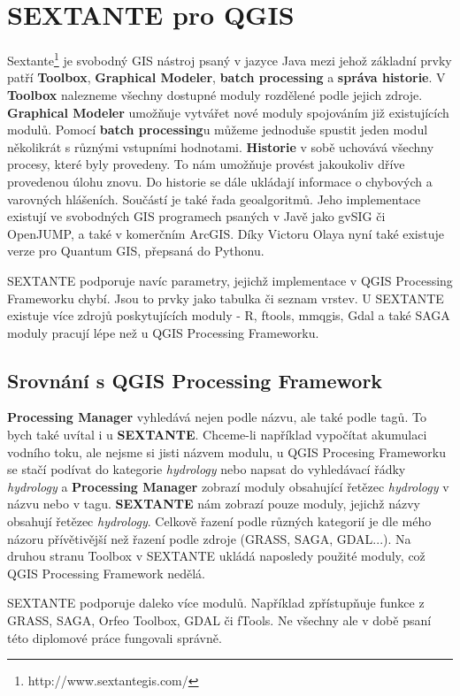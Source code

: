 \newpage
\chapter{SEXTANTE pro QGIS}
Sextante\footnote{http://www.sextantegis.com/} je svobodný GIS nástroj
psaný v jazyce Java mezi jehož základní prvky
patří \textbf{Toolbox}, \textbf{Graphical Modeler}, \textbf{batch
processing} a \textbf{správa historie}. V \textbf{Toolbox} nalezneme
všechny dostupné moduly rozdělené podle jejich
zdroje. \textbf{Graphical Modeler} umožňuje vytvářet nové moduly
spojováním již existujících modulů. Pomocí \textbf{batch processing}u
můžeme jednoduše spustit jeden modul několikrát s různými vstupními
hodnotami. \textbf{Historie} v sobě uchovává všechny procesy, které
byly provedeny. To nám umožňuje provést jakoukoliv dříve provedenou
úlohu znovu. Do historie se dále ukládají informace o chybových a
varovných hlášeních. Součástí je také řada geoalgoritmů. Jeho
implementace existují ve svobodných GIS programech psaných v Javě jako
gvSIG či OpenJUMP, a také v komerčním ArcGIS. Díky Victoru Olaya nyní
také existuje verze pro Quantum GIS, přepsaná do Pythonu.

SEXTANTE podporuje navíc parametry, jejichž implementace v QGIS
Processing Frameworku chybí. Jsou to prvky jako tabulka či seznam
vrstev. U SEXTANTE existuje více zdrojů poskytujících moduly - R,
ftools, mmqgis, Gdal a také SAGA moduly pracují lépe než u QGIS
Processing Frameworku.

\section{Srovnání s QGIS Processing Framework}

\textbf{Processing Manager} vyhledává nejen podle názvu, ale také podle tagů. To bych také uvítal i u \textbf{SEXTANTE}. Chceme-li například vypočítat akumulaci vodního toku, ale nejsme si jisti názvem modulu, u QGIS Procesing Frameworku se stačí podívat do kategorie \textit{hydrology} nebo napsat do vyhledávací řádky \textit{hydrology} a \textbf{Processing Manager} zobrazí moduly obsahující řetězec \textit{hydrology} v názvu nebo v tagu. \textbf{SEXTANTE} nám zobrazí pouze moduly, jejichž názvy obsahují řetězec \textit{hydrology}. Celkově řazení podle různých kategorií je dle mého názoru přívětivější než řazení podle zdroje (GRASS, SAGA, GDAL...). Na druhou stranu Toolbox v SEXTANTE ukládá naposledy použité moduly, což QGIS Processing Framework nedělá.

SEXTANTE podporuje daleko více modulů. Například zpřístupňuje funkce z
GRASS, SAGA, Orfeo Toolbox, GDAL či fTools. Ne všechny ale v době
psaní této diplomové práce fungovali správně.

